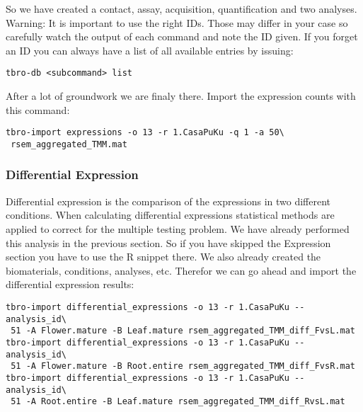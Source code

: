 \documentclass[english]{scrartcl}
\begin{document}
So we have created a contact, assay, acquisition, quantification and two
analyses. Warning: It is important to use the right IDs. Those may differ in
your case so carefully watch the output of each command and note the ID given.
If you forget an ID you can always have a list of all available entries by
issuing:
\begin{lstlisting}
tbro-db <subcommand> list
\end{lstlisting}
After a lot of groundwork we are finaly there. Import the expression counts with
this command:
\begin{lstlisting}
tbro-import expressions -o 13 -r 1.CasaPuKu -q 1 -a 50\
 rsem_aggregated_TMM.mat
\end{lstlisting}

\subsubsection{Differential Expression}
Differential expression is the comparison of the expressions in two different
conditions. When calculating differential expressions statistical methods are
applied to correct for the multiple testing problem. We have already performed
this analysis in the previous section. So if you have skipped the Expression
section you have to use the R snippet there. We also already created the
biomaterials, conditions, analyses, etc. Therefor we can go ahead and import the
differential expression results:
\begin{lstlisting}
tbro-import differential_expressions -o 13 -r 1.CasaPuKu --analysis_id\
 51 -A Flower.mature -B Leaf.mature rsem_aggregated_TMM_diff_FvsL.mat
tbro-import differential_expressions -o 13 -r 1.CasaPuKu --analysis_id\
 51 -A Flower.mature -B Root.entire rsem_aggregated_TMM_diff_FvsR.mat
tbro-import differential_expressions -o 13 -r 1.CasaPuKu --analysis_id\
 51 -A Root.entire -B Leaf.mature rsem_aggregated_TMM_diff_RvsL.mat
\end{lstlisting}
\end{document}
